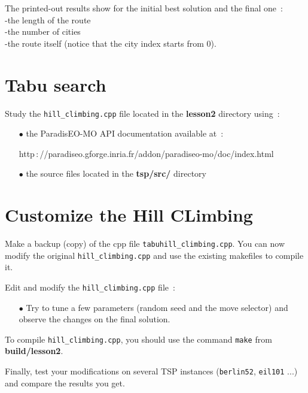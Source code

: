 \documentclass[a4paper]{article}
\begin{document}
    The printed-out results show for the initial best solution and the final one~:
    \\ \hspace*{0.5cm}-the length of the route
    \\ \hspace*{0.5cm}-the number of cities
    \\ \hspace*{0.5cm}-the route itself (notice that the city index starts from 0).


\section{Tabu search}

    Study the {\tt hill\_climbing.cpp} file located in the {\bf lesson2} directory
    using~:
    \begin{itemize}
       \item[$\bullet$] the ParadisEO-MO API documentation available at~:

       \hspace{1cm}http$\,:$//paradiseo.gforge.inria.fr/addon/paradiseo-mo/doc/index.html
       \item[$\bullet$] the source files located in the {\bf tsp/src/} directory
    \end{itemize}

\section{Customize the Hill CLimbing}

   Make a backup (copy) of the cpp file {\tt tabuhill\_climbing.cpp}. You can now modify the
   original {\tt hill\_climbing.cpp} and use the existing makefiles to compile it.

     Edit and modify the {\tt hill\_climbing.cpp} file~:
    \begin{itemize}
       \item[$\bullet$] Try to tune a few parameters (random seed
       and the move selector) and observe the changes on the final
       solution.

    \end{itemize}

    \smallskip
    To compile {\tt hill\_climbing.cpp}, you should use the
    command {\tt make} from {\bf build/lesson2}.

    \medskip
    Finally, test your modifications on several TSP instances ({\tt berlin52},
    {\tt eil101} ...) and compare the results you get.
\end{document}
